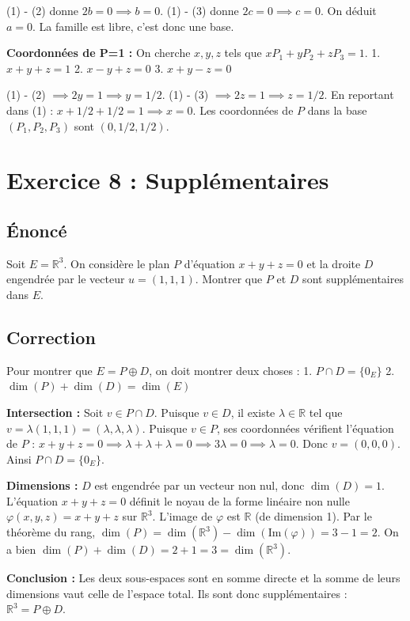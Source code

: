 \documentclass{report}
\begin{document}
(1) - (2) donne $2b = 0 \implies b = 0$.
(1) - (3) donne $2c = 0 \implies c = 0$.
On déduit $a = 0$. La famille est libre, c'est donc une base.

\textbf{Coordonnées de P=1 :}
On cherche $x, y, z$ tels que $xP_1 + yP_2 + zP_3 = 1$.
1. $x+y+z = 1$
2. $x-y+z = 0$
3. $x+y-z = 0$

(1) - (2) $\implies 2y = 1 \implies y = 1/2$.
(1) - (3) $\implies 2z = 1 \implies z = 1/2$.
En reportant dans (1) : $x + 1/2 + 1/2 = 1 \implies x = 0$.
Les coordonnées de $P$ dans la base $(P_1, P_2, P_3)$ sont $(0, 1/2, 1/2)$.

\newpage


\chapter*{Exercice 8 : Supplémentaires}

\section*{Énoncé}
Soit $E = \mathbb{R}^3$. On considère le plan $P$ d'équation $x+y+z=0$ et la droite $D$ engendrée par le vecteur $u = (1, 1, 1)$.
Montrer que $P$ et $D$ sont supplémentaires dans $E$.

\section*{Correction}
Pour montrer que $E = P \oplus D$, on doit montrer deux choses :
1. $P \cap D = \{0_E\}$
2. $\dim(P) + \dim(D) = \dim(E)$

\textbf{Intersection :}
Soit $v \in P \cap D$.
Puisque $v \in D$, il existe $\lambda \in \mathbb{R}$ tel que $v = \lambda(1, 1, 1) = (\lambda, \lambda, \lambda)$.
Puisque $v \in P$, ses coordonnées vérifient l'équation de $P$ :
$x + y + z = 0 \implies \lambda + \lambda + \lambda = 0 \implies 3\lambda = 0 \implies \lambda = 0$.
Donc $v = (0, 0, 0)$. Ainsi $P \cap D = \{0_E\}$.

\textbf{Dimensions :}
$D$ est engendrée par un vecteur non nul, donc $\dim(D) = 1$.
L'équation $x+y+z=0$ définit le noyau de la forme linéaire non nulle $\varphi(x,y,z) = x+y+z$ sur $\mathbb{R}^3$. L'image de $\varphi$ est $\mathbb{R}$ (de dimension 1). Par le théorème du rang, $\dim(P) = \dim(\mathbb{R}^3) - \dim(\text{Im}(\varphi)) = 3 - 1 = 2$.
On a bien $\dim(P) + \dim(D) = 2 + 1 = 3 = \dim(\mathbb{R}^3)$.

\textbf{Conclusion :}
Les deux sous-espaces sont en somme directe et la somme de leurs dimensions vaut celle de l'espace total. Ils sont donc supplémentaires : $\mathbb{R}^3 = P \oplus D$.
\end{document}
